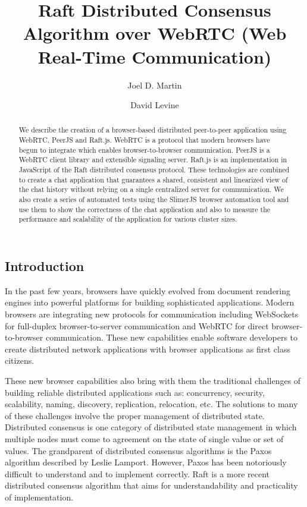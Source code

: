 \documentclass[9pt]{extarticle}
\title{Raft Distributed Consensus Algorithm over WebRTC (Web Real-Time Communication)}
\author{Joel D. Martin}
\author{David Levine}
\affil{University of Texas at Arlington}
\begin{document}
\maketitle

\begin{multicols}{2}

\begin{abstract}
We describe the creation of a browser-based distributed peer-to-peer
application using WebRTC, PeerJS and Raft.js. WebRTC is a protocol
that modern browsers have begun to integrate which enables
browser-to-browser communication. PeerJS is a WebRTC client library
and extensible signaling server. Raft.js is an implementation in
JavaScript of the Raft distributed consensus protocol. These
technologies are combined to create a chat application that guarantees
a shared, consistent and linearized view of the chat history without
relying on a single centralized server for communication. We also
create a series of automated tests using the SlimerJS browser
automation tool and use them to show the correctness of the chat
application and also to measure the performance and scalability of the
application for various cluster sizes.
\end{abstract}

\section{Introduction}
In the past few years, browsers have quickly evolved from document
rendering engines into powerful platforms for building sophisticated
applications. Modern browsers are integrating new protocols for
communication including WebSockets for full-duplex browser-to-server
communication and WebRTC for direct browser-to-browser communication.
These new capabilities enable software developers to create
distributed network applications with browser applications as first
class citizens.

These new browser capabilities also bring with them the traditional
challenges of building reliable distributed applications such as:
concurrency, security, scalability, naming, discovery, replication,
relocation, etc. The solutions to many of these challenges involve
the proper management of distributed state. Distributed consensus is
one category of distributed state management in which multiple nodes
must come to agreement on the state of single value or set of values.
The grandparent of distributed consensus algorithms is the Paxos
algorithm described by Leslie Lamport. However, Paxos has been
notoriously difficult to understand and to implement correctly. Raft
is a more recent distributed consensus algorithm that aims for
understandability and practicality of implementation.


\end{multicols}
\end{document}
